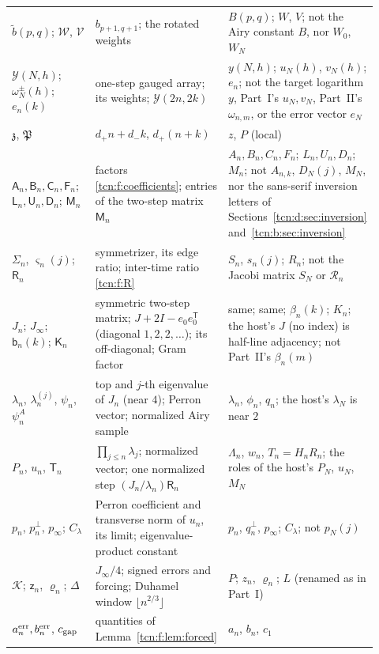\documentclass[11pt,letterpaper]{article}
\theoremstyle{remark}
\begin{document}
\begin{longtable}{@{}>{\raggedright}p{0.24\linewidth}>{\raggedright}p{0.36\linewidth}>{\raggedright\arraybackslash}p{0.32\linewidth}@{}}
$\widetilde b(p,q)$; $\mathcal W$, $\mathcal V$ & $b_{p+1,q+1}$; the rotated weights & $B(p,q)$; $W$, $V$; not the Airy constant $B$, nor $W_0$, $W_N$\\
$\mathcal Y(N,h)$; $\omega^\pm_N(h)$; $e_n(k)$ & one-step gauged array; its weights; $\mathcal Y(2n,2k)$ & $y(N,h)$; $u_N(h)$, $v_N(h)$; $e_n$; not the target logarithm $y$, Part~I's $u_N,v_N$, Part~II's $\omega_{n,m}$, or the error vector $e_N$\\
$\mathfrak z$, $\mathfrak P$ & $d_+n+d_-k$, $d_+(n+k)$ & $z$, $P$ (local)\\
$\mathsf A_n,\mathsf B_n,\mathsf C_n,\mathsf F_n$; $\mathsf L_n,\mathsf U_n,\mathsf D_n$; $\mathsf M_n$ & factors \eqref{tcn:f:coefficients}; entries of the two-step matrix $\mathsf M_n$ & $A_n,B_n,C_n,F_n$; $L_n,U_n,D_n$; $M_n$; not $A_{n,k}$, $D_N(j)$, $M_N$, nor the sans-serif inversion letters of Sections~\ref{tcn:d:sec:inversion} and~\ref{tcn:b:sec:inversion}\\
$\Sigma_n$, $\varsigma_n(j)$; $\mathsf R_n$ & symmetrizer, its edge ratio; inter-time ratio \eqref{tcn:f:R} & $S_n$, $s_n(j)$; $R_n$; not the Jacobi matrix $S_N$ or $\mathcal R_n$\\
$J_n$; $J_\infty$; $\mathsf b_n(k)$; $\mathsf K_n$ & symmetric two-step matrix; $J+2I-e_0e_0^{\mathsf T}$ (diagonal $1,2,2,\ldots$); its off-diagonal; Gram factor & same; same; $\beta_n(k)$; $K_n$; the host's $J$ (no index) is half-line adjacency; not Part~II's $\beta_n(m)$\\
$\lambda_n$, $\lambda_n^{(j)}$, $\psi_n$, $\psi^A_n$ & top and $j$-th eigenvalue of $J_n$ (near $4$); Perron vector; normalized Airy sample & $\lambda_n$, $\phi_n$, $q_n$; the host's $\lambda_N$ is near $2$\\
$P_n$, $u_n$, $\mathsf T_n$ & $\prod_{j\le n}\lambda_j$; normalized vector; one normalized step $(J_n/\lambda_n)\mathsf R_n$ & $\Lambda_n$, $w_n$, $T_n=H_nR_n$; the roles of the host's $P_N$, $u_N$, $M_N$\\
$p_n$, $p_n^\perp$, $p_\infty$; $C_\lambda$ & Perron coefficient and transverse norm of $u_n$, its limit; eigenvalue-product constant & $p_n$, $q_n^\perp$, $p_\infty$; $C_\lambda$; not $p_N(j)$\\
$\mathcal K$; $\mathsf z_n$, $\varrho_n$; $\Delta$ & $J_\infty/4$; signed errors and forcing; Duhamel window $\lfloor n^{2/3}\rfloor$ & $P$; $z_n$, $\varrho_n$; $L$ (renamed as in Part~I)\\
$a^{\rm err}_n,b^{\rm err}_n$, $c_{\rm gap}$ & quantities of Lemma~\ref{tcn:f:lem:forced} & $a_n$, $b_n$, $c_1$\\

\end{longtable}
\end{document}

